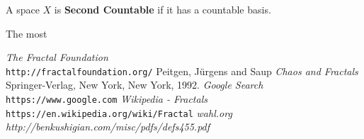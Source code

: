 \documentclass[11pt,oneside,final]{article}
\begin{document}
\begin{dfn} A space \(X\) is \textbf{Second Countable} if it has a countable
	basis. 
\end{dfn}

The most 


\begin{thebibliography}{9}
	\textit{The Fractal Foundation}
	\\\texttt{http://fractalfoundation.org/}
	Peitgen, J\"urgens and Saup
	\textit{Chaos and Fractals}
	Springer-Verlag, New York, New York, 1992.
	\textit{Google Search}
	\\\texttt{https://www.google.com}
	\textit{Wikipedia - Fractals}
	\\\texttt{https://en.wikipedia.org/wiki/Fractal}
	\textit{wahl.org}
	\\\textit{http://benkushigian.com/misc/pdfs/defs455.pdf}
\end{thebibliography}
\end{document}
